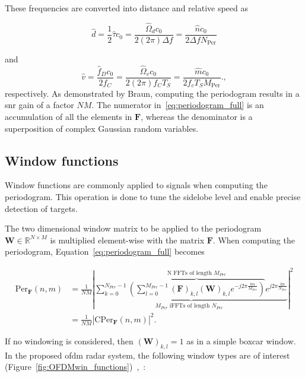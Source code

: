     These frequencies are converted into distance and relative speed as

    \begin{equation}
        \hat{d} = \frac{1}{2}\hat{\tau}c_0 = \frac{\hat{\Omega}_d c_0}{2 (2\pi) \Delta f} = \frac{\hat{n}c_0}{2\Delta f N_\text{Per}}
    \end{equation}
    
    and
    \begin{equation}
    	\hat{v} = \frac{\hat{f}_D c_0 }{2 f_C} = \frac{\hat{\Omega}_v c_0}{2(2\pi)f_CT_S} =  \frac{\hat{m}c_0}{2f_cT_S M_{\text{Per}}}.,
    \end{equation}
    respectively.
    As demonstrated by Braun, computing the periodogram results in a \gls{snr} gain of a factor $NM$. The numerator in~\eqref{eq:periodogram_full} is an accumulation of all the elements in $\mathbf F$, whereas the denominator is a superposition of complex Gaussian random variables.
    
	\subsection{Window functions}
	
	Window functions are commonly applied to signals when computing the periodogram. This operation is done to tune the sidelobe level and enable precise detection of targets. 
	
	The two dimensional window matrix to be applied to the periodogram $\mathbf W \in \mathbb{R}^{N\times M}$ is multiplied element-wise with the matrix $\mathbf F$. When computing the periodogram, Equation~\eqref{eq:periodogram_full} becomes
	
	
	   \begin{align}
		\text{Per}_{\mathbf F}(n,m) &= \frac{1}{NM} \left| \underbrace{ \sum_{k=0}^{N_{Per}-1}  \overbrace{\left( \sum_{l=0}^{M_{Per}-1} (\bm{F})_{k,l} (\mathbf W)_{k,l} e^{-j2\pi \frac{lm}{M_{Per}}} \right)}^{\text{N FFTs of length $M_{Per}$}}  e^{j2\pi\frac{kn}{N_{Per}}}}_{ \text{$M_{Per}$ iFFTs of length $N_{Per}$ }} \right| ^ 2\\
		&= \frac{1}{NM} \left| \text{CPer}_{\bm{F}}(n,m) \right| ^ 2.
		\end{align}
	 
	 If no windowing is considered, then $(\mathbf W)_{k,l} = 1$ as in a simple boxcar window.
	 In the proposed \gls{ofdm} radar system, the following window types are of interest (Figure~\ref{fig:OFDMwin_functions})~\cite{Braun2014OFDMRA},~\cite{SASPWEB2011}:
	 
